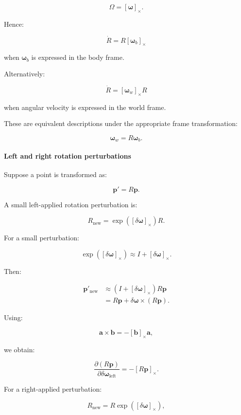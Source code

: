 \[
\Omega=[\boldsymbol\omega]_\times.
\]

Hence:

\[
\boxed{ \dot R=R[\boldsymbol\omega_b]_\times }
\]

when \(\boldsymbol\omega_b\) is expressed in the body frame.

Alternatively:

\[
\boxed{ \dot R=[\boldsymbol\omega_w]_\times R }
\]

when angular velocity is expressed in the world frame.

These are equivalent descriptions under the appropriate frame transformation:

\[
\boldsymbol\omega_w=R\boldsymbol\omega_b.
\]

\paragraph{Left and right rotation perturbations}\label{02-foundations-ii-ch027-left-and-right-rotation-perturbations}

\hypertarget{02-foundations-ii-ch027-left-and-right-rotation-perturbations}{}

Suppose a point is transformed as:

\[
\mathbf p'=R\mathbf p.
\]

A small left-applied rotation perturbation is:

\[
R_{\mathrm{new}} = \exp([\delta\boldsymbol\omega]_\times)R.
\]

For a small perturbation:

\[
\exp([\delta\boldsymbol\omega]_\times) \approx I+[\delta\boldsymbol\omega]_\times.
\]

Then:

\[
\begin{aligned} \mathbf p'_{\mathrm{new}} &\approx (I+[\delta\boldsymbol\omega]_\times)R\mathbf p\\ &=R\mathbf p+ \delta\boldsymbol\omega\times(R\mathbf p). \end{aligned}
\]

Using:

\[
\mathbf a\times\mathbf b = -[\mathbf b]_\times\mathbf a,
\]

we obtain:

\[
\boxed{ \frac{\partial(R\mathbf p)} {\partial\delta\boldsymbol\omega_{\mathrm{left}}} = -[R\mathbf p]_\times }.
\]

For a right-applied perturbation:

\[
R_{\mathrm{new}} = R\exp([\delta\boldsymbol\omega]_\times),
\]

